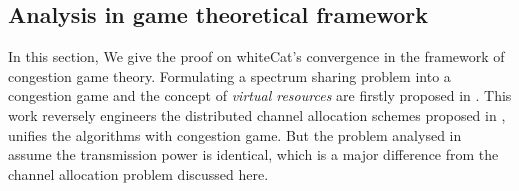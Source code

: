 \subsection{Analysis in game theoretical framework}
\label{game}
In this section, We give the proof on whiteCat's convergence in the framework of congestion game theory.
Formulating a spectrum sharing problem into a congestion game and the concept of \textit{virtual resources} are firstly proposed in \cite{allerton08_liu}.
This work reversely engineers the distributed channel allocation schemes proposed in \cite{babadi_08, Ko_DistributedCA}, \ie unifies the algorithms with congestion game.
But the problem analysed in~\cite{allerton08_liu} assume the transmission power is identical, which is a major difference from the channel allocation problem discussed here. 

